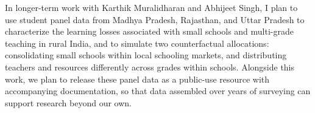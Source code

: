 \documentclass[letter,10pt]{article}
\begin{document}
In longer-term work with Karthik Muralidharan and Abhijeet Singh, I plan to use student panel data from Madhya Pradesh, Rajasthan, and Uttar Pradesh to characterize the learning losses associated with small schools and multi-grade teaching in rural India, and to simulate two counterfactual allocations: consolidating small schools within local schooling markets, and distributing teachers and resources differently across grades within schools. Alongside this work, we plan to release these panel data as a public-use resource with accompanying documentation, so that data assembled over years of surveying can support research beyond our own.
\end{document}
